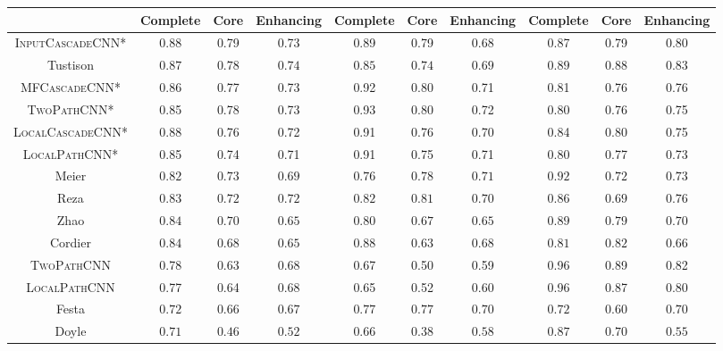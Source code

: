 \documentclass[final,5p,times,twocolumn]{elsarticle}
\begin{document}
{\begin{table*}[tp]
\begin{center}
{\begin{tabular}{*{10}{c}}
\cline{2-10}

  &Complete &Core &Enhancing &Complete &Core &Enhancing &Complete &Core &Enhancing\\ \hline

 \rowcolor[gray]{0.9}\textsc{InputCascadeCNN*}&  0.88  &0.79  &0.73  &0.89  &0.79  &0.68  &0.87  &0.79  &0.80      \\ 

Tustison	&$0.87$	&$0.78$	&$0.74$	&$0.85$	&$0.74$	&$0.69$	&$0.89$	&$0.88$	&$0.83$	\\ 



 \rowcolor[gray]{0.9}\textsc{MFCascadeCNN*} &  0.86  &0.77  &0.73  &0.92  &0.80  &0.71  &0.81  &0.76  &0.76      \\ 

     



\rowcolor[gray]{0.9}\textsc{TwoPathCNN*} &0.85 & 0.78 & 0.73 &0.93  &0.80  &0.72  &0.80  &0.76  &0.75   \\ 

 \rowcolor[gray]{0.9}\textsc{LocalCascadeCNN*} &  0.88  &0.76  &0.72  &0.91  &0.76  &0.70  &0.84  &0.80  &0.75      \\ 

\rowcolor[gray]{0.9}\textsc{LocalPathCNN*}&  0.85  &0.74  &0.71  &0.91  &0.75  &0.71  &0.80  &0.77  &0.73   \\ Meier    	&$0.82$	&$0.73$	&$0.69$	&$0.76$	&$0.78$	&$0.71$	&$0.92$	&$0.72$	&$0.73$\\ Reza  	&$0.83$	&$0.72$	&$0.72$	&$0.82$	&$0.81$	&$0.70$	&$0.86$	&$0.69$	&$0.76$	\\ Zhao    	&$0.84$	&$0.70$	&$0.65$	&$0.80$	&$0.67$	&$0.65$	&$0.89$	&$0.79$	&$0.70$\\ Cordier 	&$0.84$	&$0.68$	&$0.65$	&$0.88$	&$0.63$	&$0.68$	&$0.81$	&$0.82$	&$0.66$\\ \rowcolor[gray]{0.9}\textsc{TwoPathCNN}&  0.78  &0.63  &0.68  &0.67  &0.50  &0.59  &0.96  &0.89  &0.82  \\ \rowcolor[gray]{0.9}\textsc{LocalPathCNN}&  0.77  &0.64  &0.68  &0.65  &0.52  &0.60  &0.96  &0.87  &0.80  \\ Festa 	&$0.72$	&$0.66$	&$0.67$	&$0.77$	&$0.77$	&$0.70$	&$0.72$	&$0.60$	&$0.70$	\\ Doyle 	&$0.71$	&$0.46$	&$0.52$	&$0.66$	&$0.38$	&$0.58$	&$0.87$	&$0.70$	&$0.55$	\\ \hline


\end{tabular}
}
\end{center}
\label{tab:brats-test}
\end{table*}

}
\end{document}
